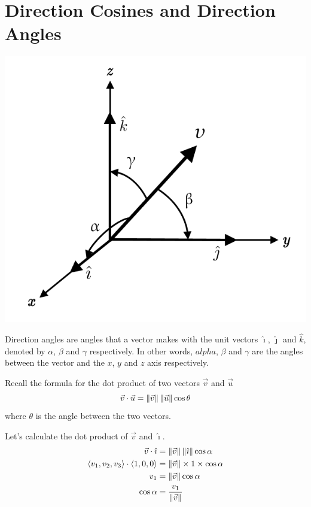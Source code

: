 \chapter{Direction Cosines and Direction Angles}

\begin{center}
    \includegraphics[scale=0.25]{assets/Direction_cosine_vector 1.png}
\end{center}

Direction angles are angles that a vector makes with the unit vectors
$\hat{\imath}$, $\hat{\jmath}$ and $\hat{k}$, denoted by $\alpha$, $\beta$ and
$\gamma$ respectively. In other words, $alpha$, $\beta$ and $\gamma$ are the
angles between the vector and the $x$, $y$ and $z$ axis respectively.

Recall the formula for the dot product of two vectors $\vec{v}$ and $\vec{u}$\[ \vec{v} \cdot \vec{u} = \left\lVert\vec{v}\right\rVert \left\lVert\vec{u}\right\rVert \cos\theta\] where $\theta$ is the angle between the two vectors.

Let's calculate the dot product of $\vec{v}$ and $\hat{\imath}$.
\begin{align*}
    \vec{v} \cdot \hat{\imath}                                  & = \left\lVert\vec{v}\right\rVert \left\lVert\hat{\imath}\right\rVert \cos\alpha \\
    \langle v_1, v_2, v_3 \rangle \cdot \langle 1, 0, 0 \rangle & = \left\lVert\vec{v}\right\rVert \times 1 \times \cos\alpha     \\
    v_1                                                         & = \left\lVert\vec{v}\right\rVert \cos\alpha                     \\
    \cos\alpha                                                  & = \frac{v_1}{\left\lVert\vec{v}\right\rVert}
\end{align*}

